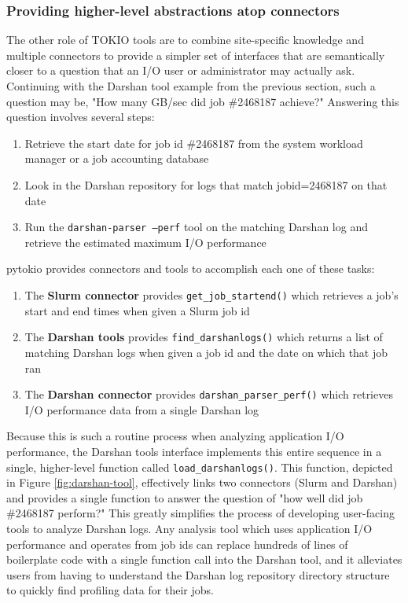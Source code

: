 \subsubsection{Providing higher-level abstractions atop connectors}

The other role of TOKIO tools are to combine site-specific knowledge and multiple connectors to provide a simpler set of interfaces that are semantically closer to a question that an I/O user or administrator may actually ask.
Continuing with the Darshan tool example from the previous section, such a question may be, "How many GB/sec did job \#2468187 achieve?"
Answering this question involves several steps:

\begin{enumerate}[leftmargin=*]
\item Retrieve the start date for job id \#2468187 from the system workload manager or a job accounting database
\item Look in the Darshan repository for logs that match jobid=2468187 on that date
\item Run the \texttt{darshan-parser --perf} tool on the matching Darshan log and retrieve the estimated maximum I/O performance
\end{enumerate}

pytokio provides connectors and tools to accomplish each one of these tasks:

\begin{enumerate}[leftmargin=*]
\item The \textbf{Slurm connector} provides \texttt{get\_job\_startend()} which retrieves a job's start and end times when given a Slurm job id
\item The \textbf{Darshan tools} provides \texttt{find\_darshanlogs()} which returns a list of matching Darshan logs when given a job id and the date on which that job ran
\item The \textbf{Darshan connector} provides \texttt{darshan\_parser\_perf()} which retrieves I/O performance data from a single Darshan log
\end{enumerate}

Because this is such a routine process when analyzing application I/O performance, the Darshan tools interface implements this entire sequence in a single, higher-level function called \texttt{load\_darshanlogs()}.
This function, depicted in Figure \ref{fig:darshan-tool}, effectively links two connectors (Slurm and Darshan) and provides a single function to answer the question of "how well did job \#2468187 perform?"
This greatly simplifies the process of developing user-facing tools to analyze Darshan logs.
Any analysis tool which uses application I/O performance and operates from job ids can replace hundreds of lines of boilerplate code with a single function call into the Darshan tool, and it alleviates users from having to understand the Darshan log repository directory structure to quickly find profiling data for their jobs.

